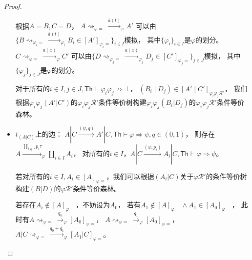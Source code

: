 \begin{proof}
\begin{itemize}
{         根据$A=B,C=D$，
         $A\rightsquigarrow_{\varphi = }\stackrel{\overline{a}(t)}{\longrightarrow}_{\varphi}A'$
         可以由$\{B\rightsquigarrow_{\varphi_i =}\stackrel{\overline{a}(t)}{\longrightarrow}_{\varphi_i}B_i\in [A']_{\varphi_i=}\}_{i\in I}$模拟，
         其中$\{\varphi_i\}_{i\in I}$是$\varphi$的划分。
         $C\rightsquigarrow_{\varphi = }\stackrel{a(x)}{\longrightarrow}_{\varphi}C'$
         可以由$\{D\rightsquigarrow_{\varphi_j =}\stackrel{a(x)}{\longrightarrow}_{\varphi_j}D_j\in [C']_{\varphi_j=}\}_{j\in J}$模拟，
         其中$\{\varphi_j\}_{j\in J}$是$\varphi$的划分。

         对于所有的$i\in I, j\in J, \mathsf{Th}\vdash \varphi_i\varphi_j\not\Rightarrow \bot$，
         $(B_i\mid D_j)\in[A'\mid C']_{\varphi_i\varphi_j \mathcal{R'}}$，
         我们根据$\varphi_i\varphi_j(A'|C')$的$\varphi_i\varphi_j \mathcal{R}' $条件等价树构建$\varphi_i\varphi_j(B_i|D_j)$的$\varphi_i\varphi_j \mathcal{R}' $条件等价森林。
      }
      \item {
         $t_{(A|C)}$上的边：
         $A|C\stackrel{(\psi, q)}{\rightarrow} A'|C, \mathsf{Th}\vdash \varphi\Rightarrow\psi, q\in(0,1)$，
         则存在$A\stackrel{\coprod_{i\in I}p_i\tau}{\longrightarrow}_{\varphi} \coprod_{i\in I} A_i$，
         对所有的$i\in I$，$A|C\stackrel{(\psi, p_i)}{\rightarrow} A_i|C, \mathsf{Th}\vdash \varphi\Rightarrow\psi$。

         若对所有的$i\in I, A_i\in[A]_{\varphi =}$，我们可以根据$(A_i|C)$关于$\varphi\mathcal{R}'$的条件等价树构建$(B|D)$的$\varphi\mathcal{R}'$条件等价森林。

         若存在$A_i\notin [A]_{\varphi =}$，不妨设为$A_0$，
         若有$A_1\notin[A]_{\varphi =}\wedge A_1\in [A_0]_{\varphi =}$，
         此时有$A\rightsquigarrow_{\varphi = }\stackrel{q_0}{\rightarrow}_{\varphi}[A_0]_{\varphi=}$，
         $A\rightsquigarrow_{\varphi = }\stackrel{q_1}{\rightarrow}_{\varphi}[A_0]_{\varphi=}$，
         $A|C\rightsquigarrow_{\varphi = }\stackrel{q_0+q_1}{\longrightarrow}_{\varphi}[A_1|C]_{\varphi=}$。

}
\end{itemize}
\end{proof}
